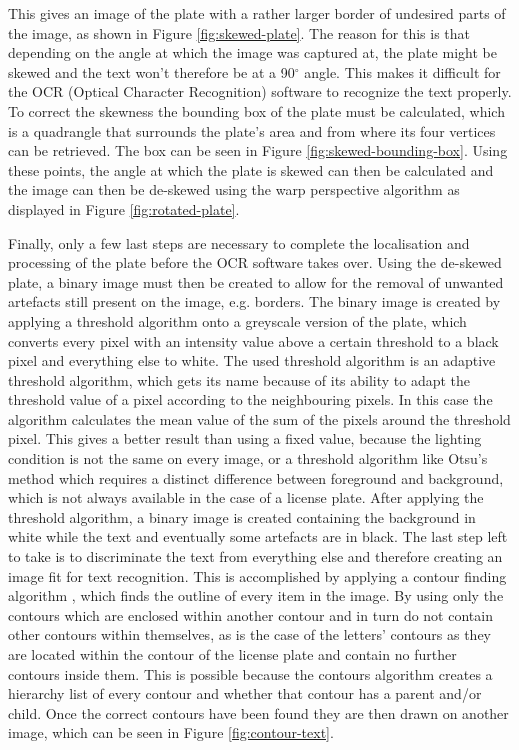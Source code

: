 This gives an image of the plate with a rather larger border of undesired parts of the image, as shown in Figure \ref{fig:skewed-plate}. The reason for this is that depending on the angle at which the image was captured at, the plate might be skewed and the text won't therefore be at a 90$^{\circ}$ angle. This makes it difficult for the OCR (Optical Character Recognition) software to recognize the text properly. To correct the skewness the bounding box of the plate must be calculated, which is a quadrangle that surrounds the plate's area and from where its four vertices can be retrieved. The box can be seen in Figure \ref{fig:skewed-bounding-box}. Using these points, the angle at which the plate is skewed can then be calculated and the image can then be de-skewed using the warp perspective algorithm \cite{warpperspective} as displayed in Figure \ref{fig:rotated-plate}. 

Finally, only a few last steps are necessary to complete the localisation and processing of the plate before the OCR software takes over. Using the de-skewed plate, a binary image must then be created to allow for the removal of unwanted artefacts still present on the image, e.g. borders. The binary image is created by applying a threshold algorithm onto a greyscale version of the plate, which converts every pixel with an intensity value above a certain threshold to a black pixel and everything else to white. The used threshold algorithm is an adaptive threshold algorithm, which gets its name because of its ability to adapt the threshold value of a pixel according to the neighbouring pixels. In this case the algorithm calculates the mean value of the sum of the pixels around the threshold pixel. This gives a better result than using a fixed value, because the lighting condition is not the same on every image, or a threshold algorithm like Otsu's method \cite{otsu} which requires a distinct difference between foreground and background, which is not always available in the case of a license plate. After applying the threshold algorithm, a binary image is created containing the background in white while the text and eventually some artefacts are in black. The last step left to take is to discriminate the text from everything else and therefore creating an image fit for text recognition. This is accomplished by applying a contour finding algorithm \cite{suzuki}, which finds the outline of every item in the image. By using only the contours which are enclosed within another contour and in turn do not contain other contours within themselves, as is the case of the letters' contours as they are located within the contour of the license plate and contain no further contours inside them. This is possible because the contours algorithm creates a hierarchy list of every contour and whether that contour has a parent and/or child. Once the correct contours have been found they are then drawn on another image, which can be seen in Figure \ref{fig:contour-text}.

